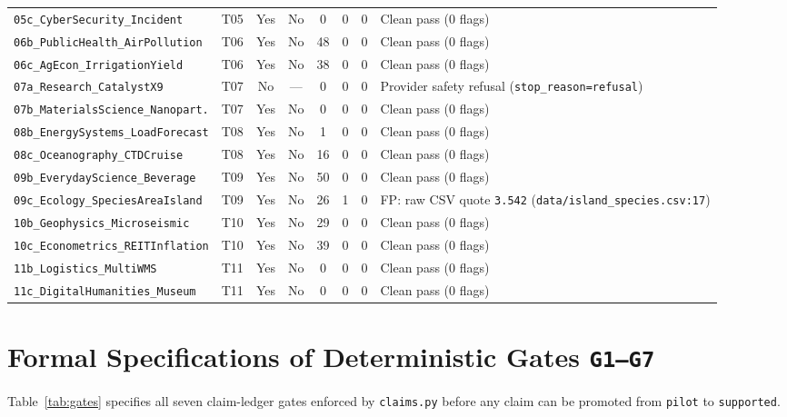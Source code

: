 \begin{table}[h]
\begin{tabular}{llcccccl}
\texttt{05c\_CyberSecurity\_Incident}  & T05 & Yes & No  & 0  & 0 & 0 & Clean pass (0 flags) \\
\texttt{06b\_PublicHealth\_AirPollution} & T06 & Yes & No  & 48 & 0 & 0 & Clean pass (0 flags) \\
\texttt{06c\_AgEcon\_IrrigationYield}  & T06 & Yes & No  & 38 & 0 & 0 & Clean pass (0 flags) \\
\texttt{07a\_Research\_CatalystX9}     & T07 & No  & --- & 0  & 0 & 0 & Provider safety refusal (\texttt{stop\_reason=refusal}) \\
\texttt{07b\_MaterialsScience\_Nanopart.} & T07 & Yes & No  & 0  & 0 & 0 & Clean pass (0 flags) \\
\texttt{08b\_EnergySystems\_LoadForecast} & T08 & Yes & No  & 1  & 0 & 0 & Clean pass (0 flags) \\
\texttt{08c\_Oceanography\_CTDCruise}  & T08 & Yes & No  & 16 & 0 & 0 & Clean pass (0 flags) \\
\texttt{09b\_EverydayScience\_Beverage} & T09 & Yes & No  & 50 & 0 & 0 & Clean pass (0 flags) \\
\texttt{09c\_Ecology\_SpeciesAreaIsland} & T09 & Yes & No  & 26 & 1 & 0 & FP: raw CSV quote \texttt{3.542} (\texttt{data/island\_species.csv:17}) \\
\texttt{10b\_Geophysics\_Microseismic} & T10 & Yes & No  & 29 & 0 & 0 & Clean pass (0 flags) \\
\texttt{10c\_Econometrics\_REITInflation} & T10 & Yes & No  & 39 & 0 & 0 & Clean pass (0 flags) \\
\texttt{11b\_Logistics\_MultiWMS}      & T11 & Yes & No  & 0  & 0 & 0 & Clean pass (0 flags) \\
\texttt{11c\_DigitalHumanities\_Museum} & T11 & Yes & No  & 0  & 0 & 0 & Clean pass (0 flags) \\
\bottomrule
\end{tabular}
\end{table}

\section{Formal Specifications of Deterministic Gates \texttt{G1--G7}}
\label{app:gates}

Table~\ref{tab:gates} specifies all seven claim-ledger gates enforced by \texttt{claims.py} before any claim can be promoted from \texttt{pilot} to \texttt{supported}.

